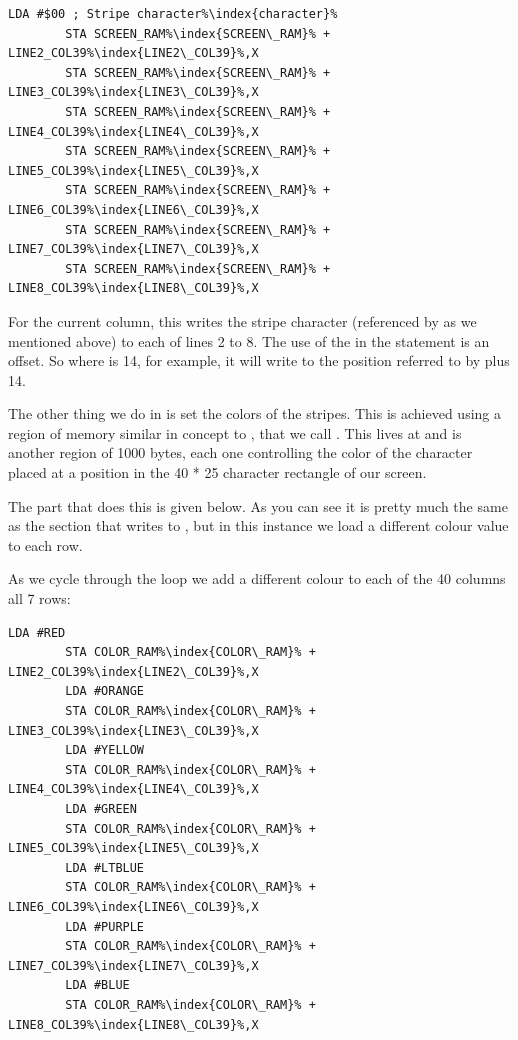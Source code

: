\begin{lstlisting}[caption=In \icode{DrawStripesBehindTitle\index{DrawStripesBehindTitle}},escapechar=\%]
        LDA #$00 ; Stripe character%\index{character}%
        STA SCREEN_RAM%\index{SCREEN\_RAM}% + LINE2_COL39%\index{LINE2\_COL39}%,X
        STA SCREEN_RAM%\index{SCREEN\_RAM}% + LINE3_COL39%\index{LINE3\_COL39}%,X
        STA SCREEN_RAM%\index{SCREEN\_RAM}% + LINE4_COL39%\index{LINE4\_COL39}%,X
        STA SCREEN_RAM%\index{SCREEN\_RAM}% + LINE5_COL39%\index{LINE5\_COL39}%,X
        STA SCREEN_RAM%\index{SCREEN\_RAM}% + LINE6_COL39%\index{LINE6\_COL39}%,X
        STA SCREEN_RAM%\index{SCREEN\_RAM}% + LINE7_COL39%\index{LINE7\_COL39}%,X
        STA SCREEN_RAM%\index{SCREEN\_RAM}% + LINE8_COL39%\index{LINE8\_COL39}%,X
\end{lstlisting}

For the current column, this writes the stripe character (referenced by  as we mentioned above) to each of lines
2 to 8. The use of the  in the  statement is an offset. So where  is 14, for example,
it will write to the position referred to by  plus 14.



The other thing we do in  is set the colors of the stripes. This is achieved using a region of memory
similar in concept to , that we call . This lives at  and is another 
region of 1000 bytes, each one controlling the color of the character placed at a position in the 40 * 25 character rectangle
of our screen. 

The part that does this is given below. As you can see it is pretty much the same as the
section that writes to , but in this instance we load a different colour value to each row.

As we cycle through the loop we add a different colour to each of the 40 columns all 7 rows:

\begin{lstlisting}[caption=In \icode{DrawStripesBehindTitle\index{DrawStripesBehindTitle}},escapechar=\%]
        LDA #RED
        STA COLOR_RAM%\index{COLOR\_RAM}% + LINE2_COL39%\index{LINE2\_COL39}%,X
        LDA #ORANGE
        STA COLOR_RAM%\index{COLOR\_RAM}% + LINE3_COL39%\index{LINE3\_COL39}%,X
        LDA #YELLOW
        STA COLOR_RAM%\index{COLOR\_RAM}% + LINE4_COL39%\index{LINE4\_COL39}%,X
        LDA #GREEN
        STA COLOR_RAM%\index{COLOR\_RAM}% + LINE5_COL39%\index{LINE5\_COL39}%,X
        LDA #LTBLUE
        STA COLOR_RAM%\index{COLOR\_RAM}% + LINE6_COL39%\index{LINE6\_COL39}%,X
        LDA #PURPLE
        STA COLOR_RAM%\index{COLOR\_RAM}% + LINE7_COL39%\index{LINE7\_COL39}%,X
        LDA #BLUE
        STA COLOR_RAM%\index{COLOR\_RAM}% + LINE8_COL39%\index{LINE8\_COL39}%,X
\end{lstlisting}

